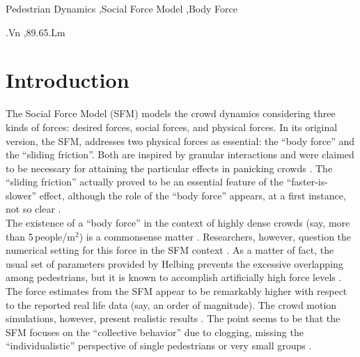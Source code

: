 \documentclass[preprint,12pt]{elsarticle}
\begin{document}
\begin{frontmatter}
\begin{abstract}
\end{abstract}

\begin{keyword}

Pedestrian Dynamics \sep Social Force Model \sep Body Force


.Vn \sep 89.65.Lm

\end{keyword}

\end{frontmatter}


\section{\label{introduction}Introduction}

The Social Force Model (SFM) models the crowd dynamics  considering three kinds
of forces: desired forces, social forces, and physical forces. In its original
version, the SFM, addresses two physical forces as essential:   the ``body
force'' and the ``sliding friction''. Both are  inspired by granular
interactions and were claimed to be necessary   for attaining the particular
effects in panicking crowds \cite{helbing_2000}.  The ``sliding friction''
actually proved to be an essential feature of the  ``faster-is-slower'' effect,
although the role of the ``body force'' appears,  at a first instance, not so
clear \cite{dorso_2005,dorso_2007,dorso_2011}. \\

The existence of a ``body force'' in the context of highly dense crowds (say,
more than 5$\,$people/m$^2$) is a commonsense matter
\cite{henein_2007,fruin_1993}. Researchers, however, question the numerical
setting for this force in  the SFM context \cite{lakoba_2005}. As a matter of
fact, the usual   set of parameters provided by  Helbing prevents the excessive
overlapping among pedestrians, but it is known to  accomplish artificially high
force levels \cite{helbing_2000,lakoba_2005,langston_2006,lin_2017}. The force
estimates from the SFM appear to be remarkably higher with respect to the
reported real life data (say, an order of magnitude). The crowd motion
simulations, however, present realistic results
\cite{lakoba_2005,langston_2006,dorso_2017}.  The point seems to be that the SFM
focuses on the ``collective behavior'' due  to clogging, missing the
``individualistic'' perspective  of single pedestrians  or very small groups
\cite{helbing_2000,henein_2007,narain_2009}.  \\
\end{document}
